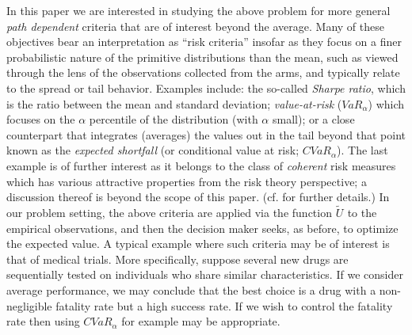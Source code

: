 \documentclass[final,12pt]{colt2018}
\newcommand{\CVAR}[1][\alpha]{CVaR_{#1}}
\newcommand{\VAR}[1][\alpha]{VaR_{#1}}
\newcommand{\Rbase}[1][]{\tilde{U}^{#1}}
\begin{document}
	In  this paper we are interested in studying the above problem for more general {\it path dependent} criteria that are of interest beyond the average. Many of these objectives bear an interpretation as ``risk criteria'' insofar as they focus on a finer probabilistic nature of the primitive distributions than the mean, such as viewed through the lens of the observations collected from the arms,  and typically  relate to the spread or tail behavior. Examples include: the so-called \emph{Sharpe ratio}, which is the ratio between the mean and standard deviation; {\em  value-at-risk} ($\VAR$) which focuses on the $\alpha$ percentile of the distribution (with $\alpha$ small); or a close counterpart that integrates (averages) the values out in the tail beyond that point known as the {\em expected shortfall} (or conditional value at risk; $\CVAR$). The last  example is of further interest as it belongs to the class of \emph{coherent} risk measures which has various attractive properties from the risk theory perspective; a discussion thereof is beyond the scope of this paper. (cf.  \cite{artzner1999coherent} for further details.) In our problem setting, the above criteria are applied via the function $\Rbase$ to the empirical observations, and then the decision maker seeks, as before, to optimize the expected value. A typical example where such criteria may be of interest is that of medical trials. More specifically, suppose several new drugs are sequentially tested on individuals who share similar characteristics. If we consider average performance, we may conclude that the best choice is a drug with a non-negligible fatality rate but a high success rate. If we wish to control the fatality rate then using $\CVAR$ for example may be appropriate.
	
\end{document}
